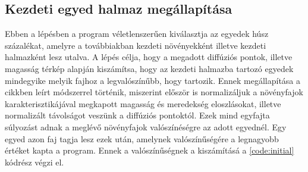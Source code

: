 \subsection{Kezdeti egyed halmaz megállapítása}

Ebben a lépésben a program véletlenszerűen kiválasztja az egyedek húsz százalékat, amelyre a továbbiakban kezdeti növényekként illetve kezdeti halmazként lesz utalva.
A lépés célja, hogy a  megadott diffúziós pontok, illetve magasság térkép alapján kiszámítsa, hogy az kezdeti halmazba tartozó egyedek mindegyike melyik fajhoz a legvalószínűbb, hogy tartozik. Ennek megállapítása a \cite{Gasch2022} cikkben leírt módszerrel történik, miszerint először is normalizáljuk a növényfajok karakterisztikájával megkapott magasság és meredekség eloszlásokat, illetve normalizált távolságot veszünk a diffúziós pontoktól. Ezek mind egyfajta súlyozást adnak a meglévő növényfajok valószínéségre az adott egyednél. Egy egyed azon faj tagja lesz ezek után, amelynek valószínűségére a legnagyobb értéket kapta a program. Ennek a valószínűségnek a kiszámításá a \ref{code:initial} kódrész végzi el. 

